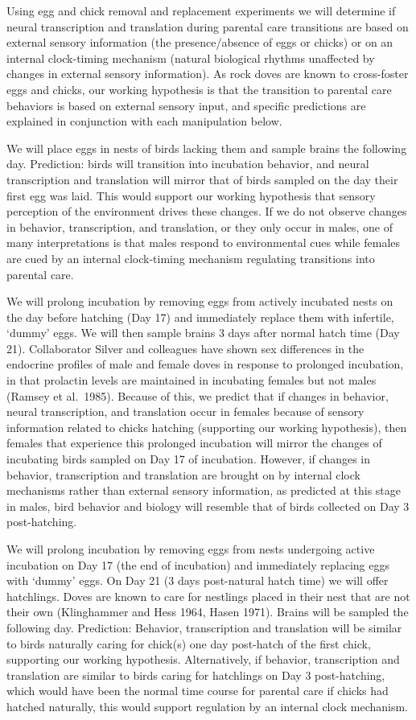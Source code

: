 \documentclass[10pt,letterpaper]{article}
\begin{document}
Using egg and chick removal and replacement experiments we will
determine if neural transcription and translation during parental care
transitions are based on external sensory information (the
presence/absence of eggs or chicks) or on an internal clock-timing
mechanism (natural biological rhythms unaffected by changes in external
sensory information). As rock doves are known to cross-foster eggs and
chicks, our working hypothesis is that the transition to parental care
behaviors is based on external sensory input, and specific predictions
are explained in conjunction with each manipulation below.

We will place eggs in nests of birds lacking them and sample brains the
following day. Prediction: birds will transition into incubation
behavior, and neural transcription and translation will mirror that of
birds sampled on the day their first egg was laid. This would support
our working hypothesis that sensory perception of the environment drives
these changes. If we do not observe changes in behavior, transcription,
and translation, or they only occur in males, one of many
interpretations is that males respond to environmental cues while
females are cued by an internal clock-timing mechanism regulating
transitions into parental care.

We will prolong incubation by removing eggs from actively incubated
nests on the day before hatching (Day 17) and immediately replace them
with infertile, `dummy' eggs. We will then sample brains 3 days after
normal hatch time (Day 21). Collaborator Silver and colleagues have
shown sex differences in the endocrine profiles of male and female doves
in response to prolonged incubation, in that prolactin levels are
maintained in incubating females but not males (Ramsey et al.~1985).
Because of this, we predict that if changes in behavior, neural
transcription, and translation occur in females because of sensory
information related to chicks hatching (supporting our working
hypothesis), then females that experience this prolonged incubation will
mirror the changes of incubating birds sampled on Day 17 of incubation.
However, if changes in behavior, transcription and translation are
brought on by internal clock mechanisms rather than external sensory
information, as predicted at this stage in males, bird behavior and
biology will resemble that of birds collected on Day 3 post-hatching.

We will prolong incubation by removing eggs from nests undergoing active
incubation on Day 17 (the end of incubation) and immediately replacing
eggs with `dummy' eggs. On Day 21 (3 days post-natural hatch time) we
will offer hatchlings. Doves are known to care for nestlings placed in
their nest that are not their own (Klinghammer and Hess 1964, Hasen
1971). Brains will be sampled the following day. Prediction: Behavior,
transcription and translation will be similar to birds naturally caring
for chick(s) one day post-hatch of the first chick, supporting our
working hypothesis. Alternatively, if behavior, transcription and
translation are similar to birds caring for hatchlings on Day 3
post-hatching, which would have been the normal time course for parental
care if chicks had hatched naturally, this would support regulation by
an internal clock mechanism.
\end{document}
